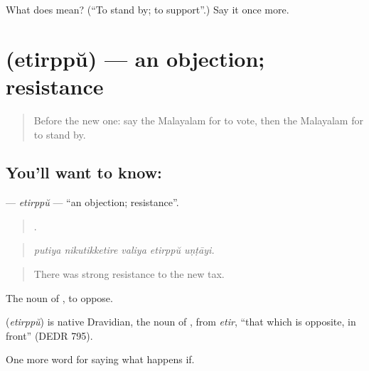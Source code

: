 \begin{tcolorbox}[breakable,colback=teal!4,colframe=teal!35!black,title={Before you move on}]
What does  mean? (\textquotedblleft{}To stand by; to support\textquotedblright{}.) Say it once more.
\end{tcolorbox}
\section[\texorpdfstring{\ml{എതിർപ്പ്} (etirppŭ)}{എതിർപ്പ് (etirppŭ)}]{ (etirppŭ) — an objection; resistance}

\label{lesson:ML-C453-etirppu}



\begin{quote}
Before the new one: say the Malayalam for to vote, then the Malayalam for to stand by.
\end{quote}

\subsection*{You'll want to know: }
\textbf{} — \emph{etirppŭ} — \textquotedblleft{}an objection; resistance\textquotedblright{}.

\begin{quote}
    .
\end{quote}

\begin{quote}
\emph{putiya nikutikketire valiya etirppŭ uṇṭāyi.}
\end{quote}

\begin{quote}
There was strong resistance to the new tax.
\end{quote}

The noun of , to oppose.

\begin{cousinweb}
\textbf{} (\emph{etirppŭ}) is native Dravidian, the noun of , from \emph{etir}, \textquotedblleft{}that which is opposite, in front\textquotedblright{} (DEDR 795).
\end{cousinweb}

\begin{grammarlens}[title={What you've built}]
One more word for saying what happens if.
\end{grammarlens}

